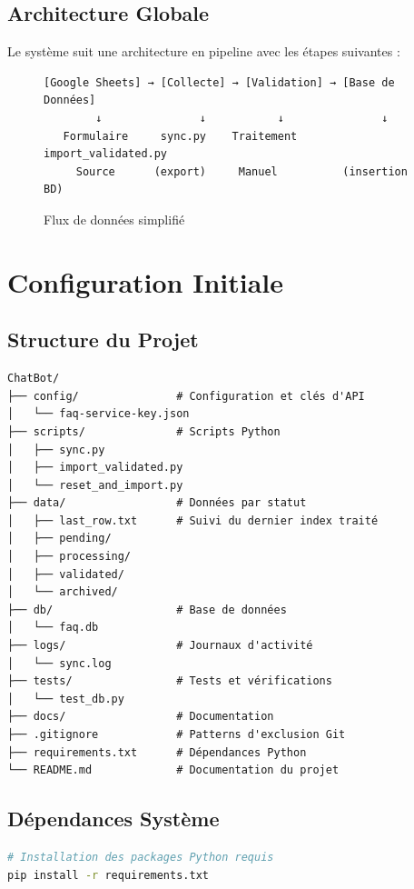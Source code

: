 \documentclass[11pt,a4paper]{article}
\begin{document}
\subsection{Architecture Globale}
Le système suit une architecture en pipeline avec les étapes suivantes :

\begin{figure}[H]
    \centering
    \begin{minipage}{0.9\textwidth}
\begin{lstlisting}
[Google Sheets] → [Collecte] → [Validation] → [Base de Données]
        ↓               ↓           ↓               ↓
   Formulaire     sync.py    Traitement     import_validated.py
     Source      (export)     Manuel          (insertion BD)
\end{lstlisting}
    \end{minipage}
    \caption{Flux de données simplifié}
\end{figure}

\section{Configuration Initiale}
\label{sec:initial-config}

\subsection{Structure du Projet}
\begin{lstlisting}
ChatBot/
├── config/               # Configuration et clés d'API
│   └── faq-service-key.json
├── scripts/              # Scripts Python
│   ├── sync.py
│   ├── import_validated.py
│   └── reset_and_import.py
├── data/                 # Données par statut
│   ├── last_row.txt      # Suivi du dernier index traité
│   ├── pending/
│   ├── processing/
│   ├── validated/
│   └── archived/
├── db/                   # Base de données
│   └── faq.db
├── logs/                 # Journaux d'activité
│   └── sync.log
├── tests/                # Tests et vérifications
│   └── test_db.py
├── docs/                 # Documentation
├── .gitignore            # Patterns d'exclusion Git
├── requirements.txt      # Dépendances Python
└── README.md             # Documentation du projet
\end{lstlisting}

\subsection{Dépendances Système}
\begin{lstlisting}[language=bash]
# Installation des packages Python requis
pip install -r requirements.txt
\end{lstlisting}
\end{document}
